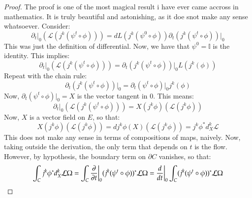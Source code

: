 \documentclass[12pt,a4paper]{report}
\theoremstyle{definition}
\theoremstyle{Theorem}
\theoremstyle{break}
\theoremstyle{definition}
\begin{document}
		\begin{proof}
			The proof is one of the most magical result i have ever came accross in mathematics. It is truly beautiful and astonishing, as it doe snot make any sense whatsoever. Consider:
			$$\partial_t\big|_0(\mathcal{L}(j^k(\psi^t\circ \phi)))=dL(j^k(\psi^0\circ \phi))\partial_t(j^k(\psi^t\circ \phi))\big|_0$$
			This was just the definition of differential. Now, we have that $\psi^0=\mathbb{I}$ is the identity. This implies:
			$$\partial_t\big|_0(\mathcal{L}(j^k(\psi^t\circ \phi)))=\partial_t(j^k(\psi^t\circ \phi))\big|_0L(j^k(\phi))$$
			Repeat with the chain rule:
			$$\partial_t(j^k(\psi^t\circ \phi))\big|_0=\partial_t(\psi^t\circ \phi)\big|_0j^k(\phi)$$
			Now, $\partial_t(\psi^t\circ \phi)\big|_0=X$ is the vector tangent in $0$. This means:
			$$\partial_t\big|_0(\mathcal{L}(j^k(\psi^t\circ \phi)))=X(j^k\phi)(\mathcal{L}(j^k\phi))$$
			Now, $X$ is a vector field on $E$, so that: 
			$$X(j^k\phi)(\mathcal{L}(j^k\phi))=dj^k\phi(X)(\mathcal{L}(j^k\phi))=j^k\phi^*d_X^k\mathcal{L}$$
			This does not make any sense in terms of compositions of maps, naively.
			Now, taking outside the derivation, the only term that depends on $t$ is the flow. However, by hypothesis, the boundary term on $\partial C$ vanishes, so that:
			$$\int_C j^k\phi^* d^k_{X}\mathcal{L}\Omega=\int_C{\partial\over \partial t}\bigg|_0(j^k(\psi^t\circ \phi))^*\mathcal{L}\Omega={d\over dt}\bigg|_0\int_C(j^k(\psi^t\circ \phi))^*\mathcal{L}\Omega$$
		\end{proof}
\end{document}
